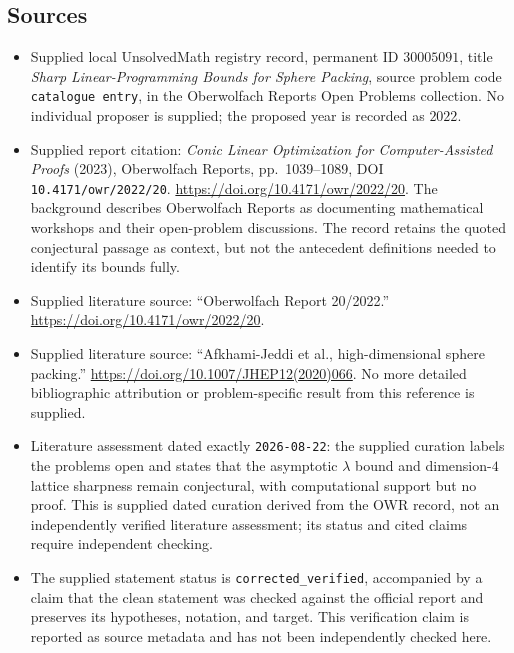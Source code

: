 \documentclass[11pt]{article}
\begin{document}
\subsection{Sources}
\begin{itemize}
\item Supplied local UnsolvedMath registry record, permanent ID \(30005091\), title \emph{Sharp Linear-Programming Bounds for Sphere Packing}, source problem code \texttt{catalogue entry}, in the Oberwolfach Reports Open Problems collection. No individual proposer is supplied; the proposed year is recorded as \(2022\).
\item Supplied report citation: \emph{Conic Linear Optimization for Computer-Assisted Proofs} (2023), Oberwolfach Reports, pp.\ 1039--1089, DOI \texttt{10.4171/owr/2022/20}. \url{https://doi.org/10.4171/owr/2022/20}. The background describes Oberwolfach Reports as documenting mathematical workshops and their open-problem discussions. The record retains the quoted conjectural passage as context, but not the antecedent definitions needed to identify its bounds fully.
\item Supplied literature source: ``Oberwolfach Report 20/2022.'' \url{https://doi.org/10.4171/owr/2022/20}.
\item Supplied literature source: ``Afkhami-Jeddi et al., high-dimensional sphere packing.'' \url{https://doi.org/10.1007/JHEP12(2020)066}. No more detailed bibliographic attribution or problem-specific result from this reference is supplied.
\item Literature assessment dated exactly \texttt{2026-08-22}: the supplied curation labels the problems open and states that the asymptotic \(\lambda\) bound and dimension-\(4\) lattice sharpness remain conjectural, with computational support but no proof. This is supplied dated curation derived from the OWR record, not an independently verified literature assessment; its status and cited claims require independent checking.
\item The supplied statement status is \texttt{corrected\_verified}, accompanied by a claim that the clean statement was checked against the official report and preserves its hypotheses, notation, and target. This verification claim is reported as source metadata and has not been independently checked here.
\end{itemize}
\end{document}
